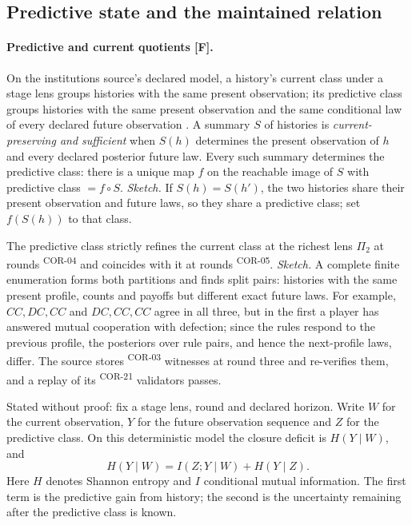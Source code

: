 \documentclass[pdflatex,sn-basic]{sn-jnl}%
\newcommand{\slot}[1]{}%
\newcommand{\rec}[1]{\ifannotated\textsuperscript{\textcolor{blue!60!black}{\tiny#1}}\fi}
\begin{document}
\begin{appendices}
\subsection{Predictive state and the maintained relation}\label{app:predictive}

\slot{A.2}
\paragraph{Predictive and current quotients [F].} On the institutions source's declared model, a history's current class under a stage lens groups histories with the same present observation; its predictive class groups histories with the same present observation and the same conditional law of every declared future observation \citep{tsiokos2026institutions}. A summary $S$ of histories is \emph{current-preserving and sufficient} when $S(h)$ determines the present observation of $h$ and every declared posterior future law. Every such summary determines the predictive class: there is a unique map $f$ on the reachable image of $S$ with predictive class $=f\circ S$. \emph{Sketch.} If $S(h)=S(h')$, the two histories share their present observation and future laws, so they share a predictive class; set $f(S(h))$ to that class.

The predictive class strictly refines the current class at the richest lens $\Pi_2$ at rounds \numInstStrictRounds\rec{COR-04} and coincides with it at rounds \numInstCoincideRounds\rec{COR-05}. \emph{Sketch.} A complete finite enumeration forms both partitions and finds split pairs: histories with the same present profile, counts and payoffs but different exact future laws. For example, $CC,DC,CC$ and $DC,CC,CC$ agree in all three, but in the first a player has answered mutual cooperation with defection; since the rules respond to the previous profile, the posteriors over rule pairs, and hence the next-profile laws, differ. The source stores \numInstSplitWitnesses\rec{COR-03} witnesses at round three and re-verifies them, and a replay of its \numInstValidators\rec{COR-21} validators passes.

Stated without proof: fix a stage lens, round and declared horizon. Write $W$ for the current observation, $Y$ for the future observation sequence and $Z$ for the predictive class. On this deterministic model the closure deficit is $H(Y\mid W)$, and
\[
H(Y\mid W)=I(Z;Y\mid W)+H(Y\mid Z).
\]
Here $H$ denotes Shannon entropy and $I$ conditional mutual information. The first term is the predictive gain from history; the second is the uncertainty remaining after the predictive class is known.


\end{appendices}
\end{document}
